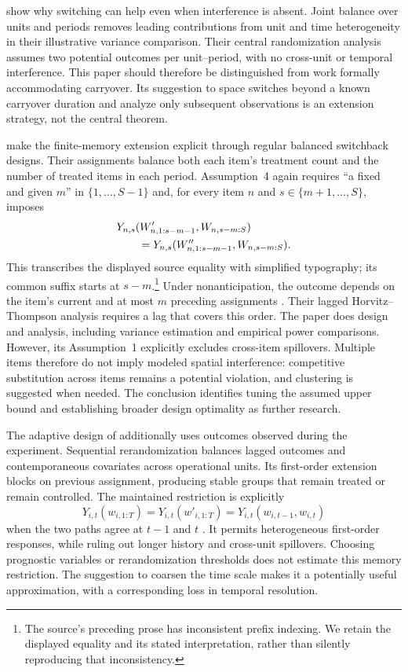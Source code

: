 \citet{masoero2023} show why switching can help even when interference is absent. Joint balance over units and periods removes leading contributions from unit and time heterogeneity in their illustrative variance comparison. Their central randomization analysis assumes two potential outcomes per unit--period, with no cross-unit or temporal interference. This paper should therefore be distinguished from work formally accommodating carryover. Its suggestion to space switches beyond a known carryover duration and analyze only subsequent observations is an extension strategy, not the central theorem.

\citet{missault2025} make the finite-memory extension explicit through regular balanced switchback designs. Their assignments balance both each item's treatment count and the number of treated items in each period. Assumption~4 again requires ``a fixed and given $m$'' in $\{1,\ldots,S-1\}$ and, for every item $n$ and $s\in\{m+1,\ldots,S\}$, imposes
\begin{align}
 &Y_{n,s}(W'_{n,1:s-m-1},W_{n,s-m:S})\notag\\
 &\qquad=Y_{n,s}(W''_{n,1:s-m-1},W_{n,s-m:S}).
 \label{eq:missault-finite-memory}
\end{align}
This transcribes the displayed source equality with simplified typography; its common suffix starts at $s-m$.\footnote{The source's preceding prose has inconsistent prefix indexing. We retain the displayed equality and its stated interpretation, rather than silently reproducing that inconsistency.} Under nonanticipation, the outcome depends on the item's current and at most $m$ preceding assignments \citep[Assumption~4, p.~6]{missault2025}. Their lagged Horvitz--Thompson analysis requires a lag that covers this order. The paper does design and analysis, including variance estimation and empirical power comparisons. However, its Assumption~1 explicitly excludes cross-item spillovers. Multiple items therefore do not imply modeled spatial interference: competitive substitution across items remains a potential violation, and clustering is suggested when needed. The conclusion identifies tuning the assumed upper bound and establishing broader design optimality as further research.

The adaptive design of \citet{zeng2026} additionally uses outcomes observed during the experiment. Sequential rerandomization balances lagged outcomes and contemporaneous covariates across operational units. Its first-order extension blocks on previous assignment, producing stable groups that remain treated or remain controlled. The maintained restriction is explicitly
\begin{equation}\label{eq:zeng-first-order}
Y_{i,t}(w_{i,1:T})=Y_{i,t}(w'_{i,1:T})
=Y_{i,t}(w_{i,t-1},w_{i,t})
\end{equation}
when the two paths agree at $t-1$ and $t$ \citep[Assumption~3(b), pp.~4--5]{zeng2026}. It permits heterogeneous first-order responses, while ruling out longer history and cross-unit spillovers. Choosing prognostic variables or rerandomization thresholds does not estimate this memory restriction. The suggestion to coarsen the time scale makes it a potentially useful approximation, with a corresponding loss in temporal resolution.

